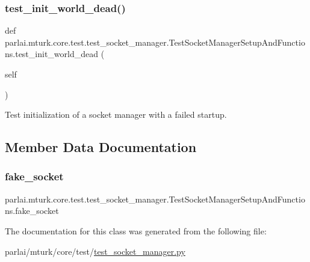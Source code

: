 \subsubsection{\texorpdfstring{test\+\_\+init\+\_\+world\+\_\+dead()}{test\_init\_world\_dead()}}
{\footnotesize\ttfamily def parlai.\+mturk.\+core.\+test.\+test\+\_\+socket\+\_\+manager.\+Test\+Socket\+Manager\+Setup\+And\+Functions.\+test\+\_\+init\+\_\+world\+\_\+dead (\begin{DoxyParamCaption}\item[{}]{self }\end{DoxyParamCaption})}

\begin{DoxyVerb}Test initialization of a socket manager with a failed startup.
\end{DoxyVerb}
 

\subsection{Member Data Documentation}
\mbox{\label{classparlai_1_1mturk_1_1core_1_1test_1_1test__socket__manager_1_1TestSocketManagerSetupAndFunctions_ad8a72a5abd683838bf08af5386561e85}} 
\subsubsection{\texorpdfstring{fake\+\_\+socket}{fake\_socket}}
{\footnotesize\ttfamily parlai.\+mturk.\+core.\+test.\+test\+\_\+socket\+\_\+manager.\+Test\+Socket\+Manager\+Setup\+And\+Functions.\+fake\+\_\+socket}



The documentation for this class was generated from the following file\+:\begin{DoxyCompactItemize}
\item 
parlai/mturk/core/test/\hyperlink{test_2test__socket__manager_8py}{test\+\_\+socket\+\_\+manager.\+py}\end{DoxyCompactItemize}
